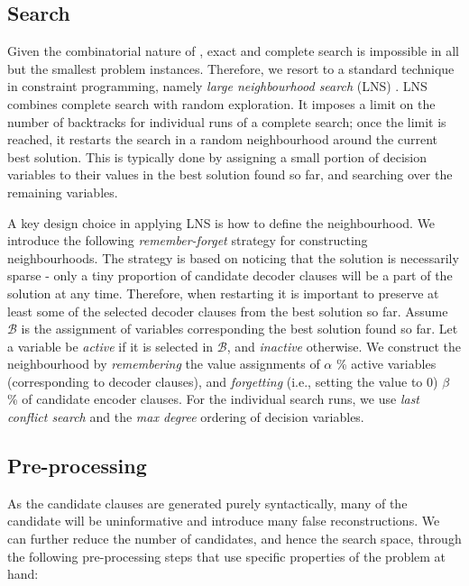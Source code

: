 \subsection{Search}

Given the combinatorial nature of , exact and complete search is impossible in all but the smallest problem instances.
Therefore, we resort to a standard technique in constraint programming, namely \textit{large neighbourhood search} (LNS) \cite{Ahuja:2002:SVL:772382.772385}. LNS combines complete search with random exploration.
It imposes a limit on the number of backtracks for individual runs of a complete search; once the limit is reached, it restarts the search in a random neighbourhood around the current best solution.
This is typically done by assigning a small portion of decision variables to their values in the best solution found so far, and searching over the remaining variables.


A key design choice in applying LNS is how to define the neighbourhood.
We introduce the following \textit{remember-forget} strategy for constructing neighbourhoods.
The strategy is based on noticing that the solution is necessarily sparse - only a tiny proportion of candidate decoder clauses will be a part of the solution at any time.
Therefore, when restarting it is important to preserve at least some of the selected decoder clauses from the best solution so far.
Assume $\mathcal{B}$ is the assignment of variables corresponding the best solution found so far.
Let a variable be \textit{active} if it is selected in $\mathcal{B}$, and \textit{inactive} otherwise.
We construct the neighbourhood by \textit{remembering} the value assignments of $\alpha$ \% active variables (corresponding to decoder clauses), and \textit{forgetting} (i.e., setting the value to 0) $\beta$ \% of candidate encoder clauses.
For the individual search runs, we use \textit{last conflict search} \cite{COS} and the \textit{max degree} ordering of decision variables.




\subsection{Pre-processing}
As the candidate clauses are generated purely syntactically, many of the candidate will be uninformative and introduce many false reconstructions.
We can further reduce the number of candidates, and hence the search space, through the following pre-processing steps that use specific properties of the problem at hand:


